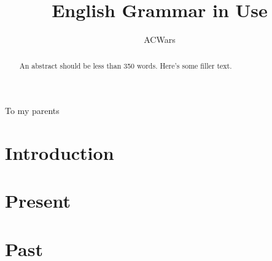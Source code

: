 \documentclass[12pt]{novax}
\title{English Grammar in Use}
\author{ACWars}
\begin{document}

\thesistitlepage

\copyrightpage

\begin{abstract}
  An abstract should be less than 350 words. Here's some filler text. \blindtext
\end{abstract}

\renewcommand{\contentsname}{\protect\centering\protect\Large Contents}
\renewcommand{\listtablename}{\protect\centering\protect\Large List of Tables}
\renewcommand{\listfigurename}{\protect\centering\protect\Large List of Figures}

\tableofcontents %

\listoftables
\listoffigures
\begin{acknowledgments}
  \blindtext
\end{acknowledgments}
\begin{dedication}
  To my parents
\end{dedication}


\chapter*{Introduction}\label{ch:intro}


\chapter{Present}\label{ch:1}


\chapter{Past}\label{ch:2}


%
\end{document}
